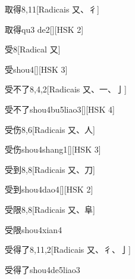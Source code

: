 \begin{entry}{取得}{8,11}[Radicais ⼜、⼻]
  \begin{phonetics}{取得}{qu3 de2}[][HSK 2]
  \end{phonetics}
\end{entry}

\begin{entry}{受}{8}[Radical ⼜]
  \begin{phonetics}{受}{shou4}[][HSK 3]
  \end{phonetics}
\end{entry}

\begin{entry}{受不了}{8,4,2}[Radicais ⼜、⼀、⼅]
  \begin{phonetics}{受不了}{shou4bu5liao3}[][HSK 4]
  \end{phonetics}
\end{entry}

\begin{entry}{受伤}{8,6}[Radicais ⼜、⼈]
  \begin{phonetics}{受伤}{shou4shang1}[][HSK 3]
  \end{phonetics}
\end{entry}

\begin{entry}{受到}{8,8}[Radicais ⼜、⼑]
  \begin{phonetics}{受到}{shou4dao4}[][HSK 2]
  \end{phonetics}
\end{entry}

\begin{entry}{受限}{8,8}[Radicais ⼜、⾩]
  \begin{phonetics}{受限}{shou4xian4}
  \end{phonetics}
\end{entry}

\begin{entry}{受得了}{8,11,2}[Radicais ⼜、⼻、⼅]
  \begin{phonetics}{受得了}{shou4de5liao3}
  \end{phonetics}
\end{entry}

